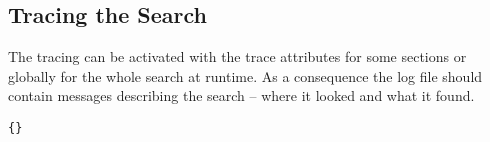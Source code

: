 \subsection{Tracing the Search}

The tracing can be activated with the trace attributes for some
sections or globally for the whole search at runtime. As a consequence
the log file should contain messages describing the search -- where it
looked and what it found.

\INCOMPLETE

\begin{lstlisting}{}
\end{lstlisting}

\endinput
%
